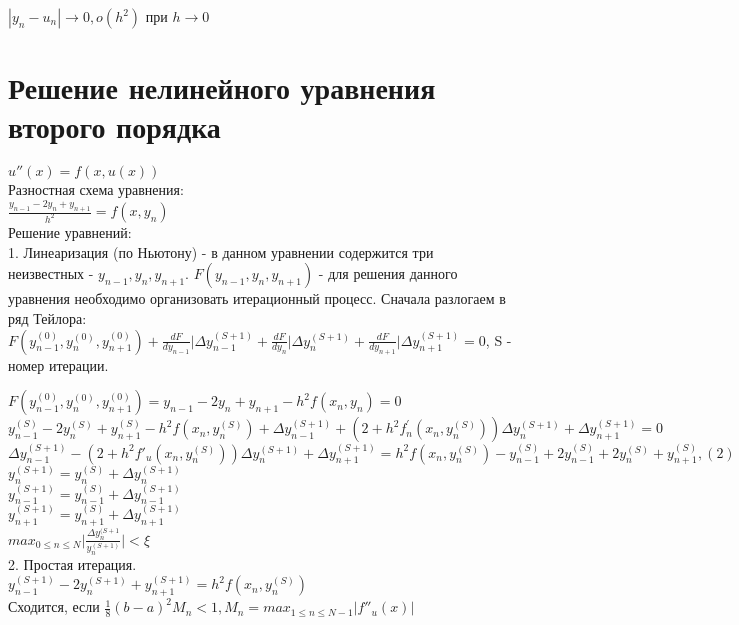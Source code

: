 $|y_{n} - u_{n}| \rightarrow 0, o(h^{2})$ при $h \rightarrow 0$\\

\section{Решение нелинейного уравнения второго порядка}
$u''(x) = f(x, u(x))$\\

Разностная схема уравнения:\\
$\frac{y_{n-1} - 2y_{n} + y_{n+1}}{h^{2}} = f(x, y_{n})$\\

Решение уравнений:\\
1. Линеаризация (по Ньютону) - в данном уравнении содержится три неизвестных - $y_{n-1}, y_{n}, y_{n+1}$. $F(y_{n-1}, y_{n}, y_{n+1})$ - для решения данного уравнения необходимо организовать итерационный процесс. Сначала разлогаем в ряд Тейлора: $F(y_{n-1}^{(0)}, y_{n}^{(0)}, y_{n+1}^{(0)}) + \frac{dF}{dy_{n-1}}\bigg|\Delta y_{n-1}^{(S+1)} + \frac{dF}{dy_{n}}\bigg|\Delta y_{n}^{(S+1)} + \frac{dF}{dy_{n+1}}\bigg|\Delta y_{n+1}^{(S+1)} = 0$, S - номер итерации.

$F(y_{n-1}^{(0)}, y_{n}^{(0)}, y_{n+1}^{(0)}) = y_{n-1} - 2y_{n} + y_{n+1} - h^{2}f(x_{n}, y_{n}) = 0$\\
$y_{n-1}^{(S)} - 2y_{n}^{(S)} + y_{n+1}^{(S)} - h^{2}f(x_{n}, y_{n}^{(S)}) + \Delta y_{n-1}^{(S+1)} + (2 + h^{2} f_{n}^{'}(x_{n}, y_{n}^{(S)})) \Delta y_{n}^{(S+1)} + \Delta y_{n+1}^{(S+1)} = 0$\\

$\Delta y_{n-1}^{(S+1)} - (2 + h^{2} f'_{u} (x_{n}, y_{n}^{(S)})) \Delta y_{n}^{(S+1)} + \Delta y_{n+1}^{(S+1)} = h^{2} f(x_{n}, y_{n}^{(S)}) - y_{n-1}^{(S)} + 2y_{n-1}^{(S)} + 2y_{n}^{(S)} + y_{n+1}^{(S)}, (2)$\\

$y_{n}^{(S+1)} = y_{n}^{(S)} + \Delta y_{n}^{(S+1)}$\\
$y_{n-1}^{(S+1)} = y_{n-1}^{(S)} + \Delta y_{n-1}^{(S+1)}$\\
$y_{n+1}^{(S+1)} = y_{n+1}^{(S)} + \Delta y_{n+1}^{(S+1)}$\\
$max_{0 \leqslant n \leqslant N} \bigg|\frac{\Delta y_{n}^{(S+1}}{y_{n}^{(S+1)}}\bigg| < \xi$\\

2. Простая итерация.\\
$y_{n-1}^{(S+1)} - 2y_{n}^{(S+1)} + y_{n+1}^{(S+1)} = h^{2} f(x_{n}, y_{n}^{(S)})$\\
Сходится, если $\frac{1}{8}(b - a)^{2} M_{n} < 1, M_{n} = max_{1 \leqslant n \leqslant N - 1} |f''_{u}(x)|$\\

